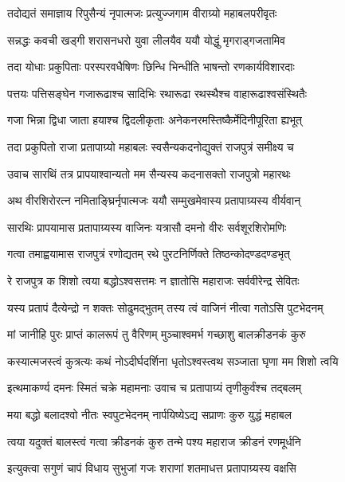 \twolineshloka
{तदोद्यतं समाज्ञाय रिपुसैन्यं नृपात्मजः}
{प्रत्युज्जगाम वीराग्र्यो महाबलपरीवृतः}%

\twolineshloka
{सन्नद्धः कवची खड्गी शरासनधरो युवा}
{लीलयैव ययौ योद्धुं मृगराड्गजतामिव}%

\twolineshloka
{तदा योधाः प्रकुपिताः परस्परवधैषिणः}
{छिन्धि भिन्धीति भाषन्तो रणकार्यविशारदाः}%

\twolineshloka
{पत्तयः पत्तिसङ्घेन गजारूढाश्च सादिभिः}
{रथारूढा रथस्थैश्च वाहारूढाश्वसंस्थितैः}%

\twolineshloka
{गजा भिन्ना द्विधा जाता हयाश्च द्विदलीकृताः}
{अनेकनरमस्तिष्कैर्मेदिनीपूरिता ह्यभूत्}%

\twolineshloka
{तदा प्रकुपितो राजा प्रतापाग्र्यो महाबलः}
{स्वसैन्यकदनोद्युक्तं राजपुत्रं समीक्ष्य च}%

\twolineshloka
{उवाच सारथिं तत्र प्रापयाश्वान्यतो मम}
{सैन्यस्य कदनासक्तो राजपुत्रो महारथः}%

\twolineshloka
{अथ वीरशिरोरत्न नमिताङ्घ्रिर्नृपात्मजः}
{ययौ सम्मुखमेवास्य प्रतापाग्र्यस्य वीर्यवान्}%

\twolineshloka
{सारथिः प्रापयामास प्रतापाग्र्यस्य वाजिनः}
{यत्रासौ दमनो वीरः सर्वशूरशिरोमणिः}%

\twolineshloka
{गत्वा तमाह्वयामास राजपुत्रं रणोद्यतम्}
{रथे पुरटनिर्णिक्ते तिष्ठन्कोदण्डदण्डभृत्}%

\twolineshloka
{रे राजपुत्र क शिशो त्वया बद्धोऽश्वसत्तमः}
{न ज्ञातोसि महाराजः सर्ववीरेन्द्र सेवितः}%

\twolineshloka
{यस्य प्रतापं दैत्येन्द्रो न शक्तः सोढुमद्भुतम्}
{तस्य त्वं वाजिनं नीत्वा गतोऽसि पुटभेदनम्}%

\twolineshloka
{मां जानीहि पुरः प्राप्तं कालरूपं तु वैरिणम्}
{मुञ्चाश्वमर्भ गच्छाशु बालक्रीडनकं कुरु}%

\twolineshloka
{कस्यात्मजस्त्वं कुत्रत्यः कथं नोऽदीर्घदर्शिना}
{धृतोऽश्वस्त्वथ सञ्जाता घृणा मम शिशो त्वयि}%

\twolineshloka
{इत्थमाकर्ण्य दमनः स्मितं चक्रे महामनाः}
{उवाच च प्रतापाग्र्यं तृणीकुर्वंश्च तद्बलम्}%


\twolineshloka
{मया बद्धो बलादश्वो नीतः स्वपुटभेदनम्}
{नार्पयिष्येऽद्य सप्राणः कुरु युद्धं महाबल}%

\twolineshloka
{त्वया यदुक्तं बालस्त्वं गत्वा क्रीडनकं कुरु}
{तन्मे पश्य महाराज क्रीडनं रणमूर्धनि}%


\twolineshloka
{इत्युक्त्वा सगुणं चापं विधाय सुभुजां गजः}
{शराणां शतमाधत्त प्रतापाग्र्यस्य वक्षसि}%

